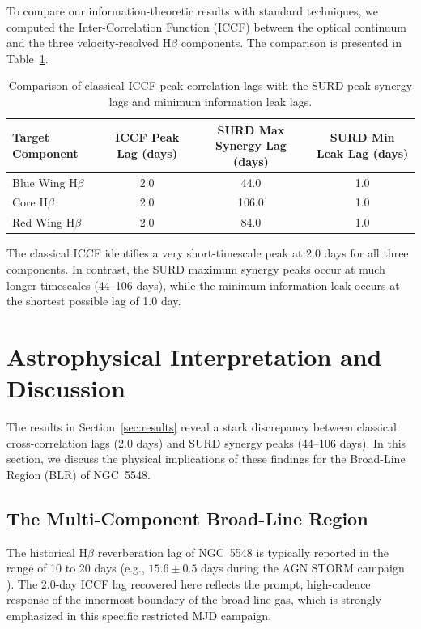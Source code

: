 \documentclass[12pt, a4paper]{article}
\begin{document}
To compare our information-theoretic results with standard techniques, we computed the Inter-Correlation Function (ICCF) between the optical continuum and the three velocity-resolved H\(\beta\) components. The comparison is presented in Table~\ref{tab:iccf_vs_surd}.

\begin{table}[ht]
\centering
\begin{tabular}{lccc}
\hline
\textbf{Target Component} & \textbf{ICCF Peak Lag (days)} & \textbf{SURD Max Synergy Lag (days)} & \textbf{SURD Min Leak Lag (days)} \\
\hline
Blue Wing H\(\beta\) & 2.0 & 44.0 & 1.0 \\
Core H\(\beta\) & 2.0 & 106.0 & 1.0 \\
Red Wing H\(\beta\) & 2.0 & 84.0 & 1.0 \\
\hline
\end{tabular}
\caption{Comparison of classical ICCF peak correlation lags with the SURD peak synergy lags and minimum information leak lags.}
\label{tab:iccf_vs_surd}
\end{table}

The classical ICCF identifies a very short-timescale peak at 2.0 days for all three components. In contrast, the SURD maximum synergy peaks occur at much longer timescales (44--106 days), while the minimum information leak occurs at the shortest possible lag of 1.0 day.


\section{Astrophysical Interpretation and Discussion}
\label{sec:discussion}

The results in Section~\ref{sec:results} reveal a stark discrepancy between classical cross-correlation lags (2.0 days) and SURD synergy peaks (44--106 days). In this section, we discuss the physical implications of these findings for the Broad-Line Region (BLR) of NGC~5548.

\subsection{The Multi-Component Broad-Line Region}

The historical H\(\beta\) reverberation lag of NGC~5548 is typically reported in the range of 10 to 20 days (e.g., $15.6 \pm 0.5$ days during the AGN STORM campaign \cite{Pei2017}). The 2.0-day ICCF lag recovered here reflects the prompt, high-cadence response of the innermost boundary of the broad-line gas, which is strongly emphasized in this specific restricted MJD campaign.
\end{document}
